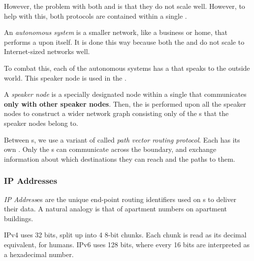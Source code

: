 However, the problem with both  and  is that they do not scale well.
However, to help with this, both protocols are contained within a single .

\begin{definition}\label{def:Autonomous_System}
  An \emph{autonomous system} is a smaller network, like a business or home, that performs a  upon itself.
  It is done this way because both the  and  do not scale to Internet-sized networks well.

  To combat this, each of the autonomous systems has a  that speaks to the outside world.
  This speaker node is used in the .
\end{definition}

\begin{definition}\label{def:Speaker_Node}
  A \emph{speaker node} is a specially designated node within a single  that communicates \textbf{only with other speaker nodes}.
  Then, the  is performed upon all the speaker nodes to construct a wider network graph consisting only of the s that the speaker nodes belong to.
\end{definition}

\begin{definition}\label{def:Path_Vector_Routing_Protocol}
  Between s, we use a variant of  called \emph{path vector routing protocol}.
  Each  has its own .
  Only the s can communicate across the  boundary, and exchange information about which destinations they can reach and the paths to them.
\end{definition}

\subsubsection{IP Addresses}\label{subsubsec:IP_Addresses}
\begin{definition}[IP Address]\label{def:IP_Address}
  \emph{IP Address}es are the unique end-point routing identifiers used on s to deliver their data.
  A natural analogy is that of apartment numbers on apartment buildings.

  IPv4 uses 32 bits, split up into 4 8-bit chunks.
  Each chunk is read as its decimal equivalent, for humans.
  IPv6 uses 128 bits, where every 16 bits are interpreted as a hexadecimal number.
\end{definition}

